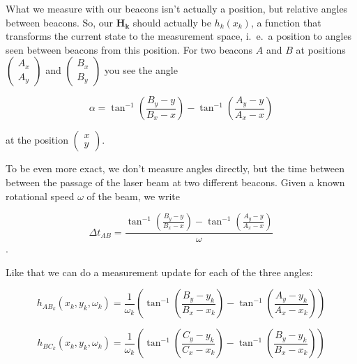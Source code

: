 \documentclass[a4paper, 12pt]{paper}
\begin{document}
What we measure with our beacons isn't actually a position, but relative angles
between beacons. So, our $\mathbf{H_k}$ should actually be $h_k(x_k)$, a
function that transforms the current state to the measurement space, i.\ e.\ a
position to angles seen between beacons from this position.
For two beacons $A$ and $B$ at positions
$\left(\begin{array}{c} A_x \\ A_y \end{array} \right)$ and 
$\left(\begin{array}{c} B_x \\ B_y \end{array} \right)$ you see the angle

\begin{equation}
    \alpha = \tan^{-1}\left(\frac{B_y-y}{B_x-x}\right)
             - \tan^{-1}\left(\frac{A_y-y}{A_x-x}\right)
    \label{eq:pos_to_angle}
\end{equation}

at the position $\left(\begin{array}{c} x \\ y \end{array} \right)$.

To be even more exact, we don't measure angles directly, but the time between
between the passage of the laser beam at two different beacons. Given a known
rotational speed $\omega$ of the beam, we write

\begin{equation}
    \Delta t_{AB} = \frac{\tan^{-1}\left(\frac{B_y-y}{B_x-x}\right)
        - \tan^{-1}\left(\frac{A_y-y}{A_x-x}\right)}{\omega}
    \label{eq:pos_to_delta_t}
\end{equation}.

Like that we can do a measurement update for each of the three angles:

\begin{equation}
    h_{AB_k}\left(x_k, y_k, \omega_k\right)
        = \frac{1}{\omega_k}\left(\tan^{-1}\left(\frac{B_y-y_k}{B_x-x_k}\right)
        - \tan^{-1}\left(\frac{A_y-y_k}{A_x-x_k}\right)\right)
    \label{eq:h_ab}
\end{equation}

\begin{equation}
    h_{BC_k}\left(x_k, y_k, \omega_k\right)
        = \frac{1}{\omega_k}\left(\tan^{-1}\left(\frac{C_y-y_k}{C_x-x_k}\right)
        - \tan^{-1}\left(\frac{B_y-y_k}{B_x-x_k}\right)\right)
    \label{eq:h_bc}
\end{equation}
\end{document}
